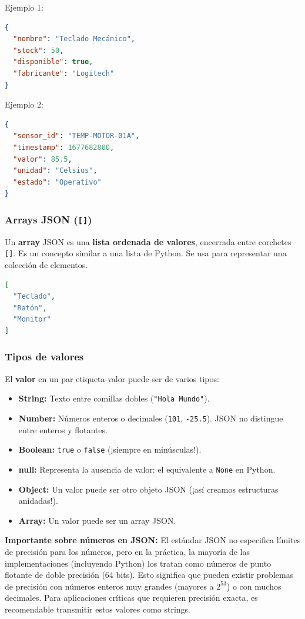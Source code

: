 Ejemplo 1:
\begin{lstlisting}[language=json]
{
  "nombre": "Teclado Mecánico",
  "stock": 50,
  "disponible": true,
  "fabricante": "Logitech"
}
\end{lstlisting}

Ejemplo 2:
\begin{lstlisting}[language=json]
{
  "sensor_id": "TEMP-MOTOR-01A",
  "timestamp": 1677682800,
  "valor": 85.5,
  "unidad": "Celsius",
  "estado": "Operativo"
}
\end{lstlisting}

\subsubsection{Arrays JSON (\texttt{[]})}
Un \textbf{array} JSON es una \textbf{lista ordenada de valores}, encerrada entre corchetes \texttt{[]}. Es un concepto similar a una lista de Python. Se usa para representar una colección de elementos.
\begin{lstlisting}[language=json]
[
  "Teclado",
  "Ratón",
  "Monitor"
]
\end{lstlisting}

\subsubsection{Tipos de valores}
El \textbf{valor} en un par etiqueta-valor puede ser de varios tipos:
\begin{itemize}
    \item \textbf{String:} Texto entre comillas dobles (\texttt{"Hola Mundo"}).
    \item \textbf{Number:} Números enteros o decimales (\texttt{101}, \texttt{-25.5}). JSON no distingue entre enteros y flotantes.
    \item \textbf{Boolean:} \texttt{true} o \texttt{false} (¡siempre en minúsculas!).
    \item \textbf{null:} Representa la ausencia de valor: el equivalente a \texttt{None} en Python.
    \item \textbf{Object:} Un valor puede ser otro objeto JSON (¡así creamos estructuras anidadas!).
    \item \textbf{Array:} Un valor puede ser un array JSON.
\end{itemize}

\begin{note}
\textbf{Importante sobre números en JSON:} El estándar JSON no especifica límites de precisión para los números, pero en la práctica, la mayoría de las implementaciones (incluyendo Python) los tratan como números de punto flotante de doble precisión (64 bits). Esto significa que pueden existir problemas de precisión con números enteros muy grandes (mayores a $2^{53}$) o con muchos decimales. Para aplicaciones críticas que requieren precisión exacta, es recomendable transmitir estos valores como strings.
\end{note}

